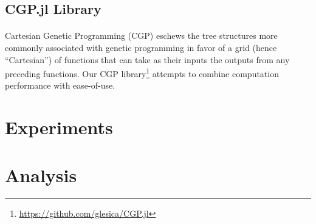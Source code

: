 \documentclass[12pt,letterpaper,titlepage]{article}
\begin{document}
\subsection{CGP.jl Library}

\paragraph{}
Cartesian Genetic Programming (CGP) eschews the tree structures more commonly
associated with genetic programming in favor of a grid (hence ``Cartesian'') of
functions that can take as their inputs the outputs from any preceding
functions. Our CGP library\footnote{\url{https://github.com/glesica/CGP.jl}}
attempts to combine computation performance with ease-of-use.

\section{Experiments}

\section{Analysis}


{}
\end{document}
